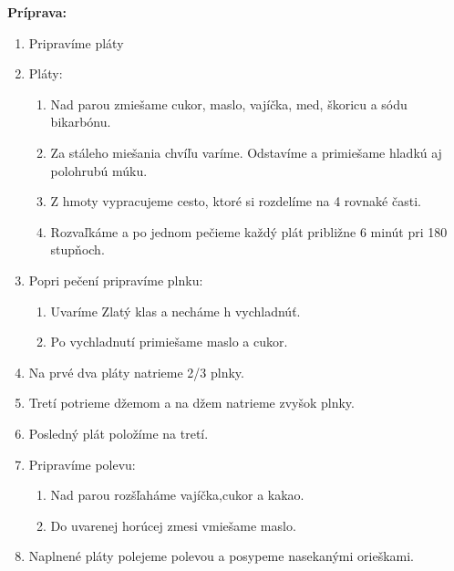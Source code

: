 \begin{recipe}
\textbf{ {\normalsize Príprava:} }
\begin{enumerate}

  \item{Pripravíme pláty}
  \item{Pláty: }
      \begin{enumerate}
          \item{Nad parou zmiešame cukor, maslo, vajíčka, med, škoricu a sódu bikarbónu.}
          \item{Za stáleho miešania chvíľu varíme. Odstavíme a primiešame hladkú aj polohrubú múku.}
          \item{Z hmoty vypracujeme cesto, ktoré si rozdelíme na 4 rovnaké časti.}
          \item{Rozvaľkáme a po jednom pečieme každý plát približne 6 minút pri 180 stupňoch.}\end{enumerate}
  \item{Popri pečení pripravíme plnku: }
      \begin{enumerate}
          \item{Uvaríme Zlatý klas a necháme h vychladnúť.}
          \item{Po vychladnutí primiešame maslo a cukor.}\end{enumerate}
  \item{Na prvé dva pláty natrieme 2/3 plnky.}
  \item{Tretí potrieme džemom a na džem natrieme zvyšok plnky.}
  \item{Posledný plát položíme na tretí.}
  \item{Pripravíme polevu: }
      \begin{enumerate}
          \item{Nad parou rozšľaháme vajíčka,cukor a kakao.}
          \item{Do uvarenej horúcej zmesi vmiešame maslo.}\end{enumerate}
  \item{Naplnené pláty polejeme polevou a posypeme nasekanými orieškami.}

\end{enumerate}
\end{recipe}

\begin{notes}
  
\end{notes}	
\clearpage
